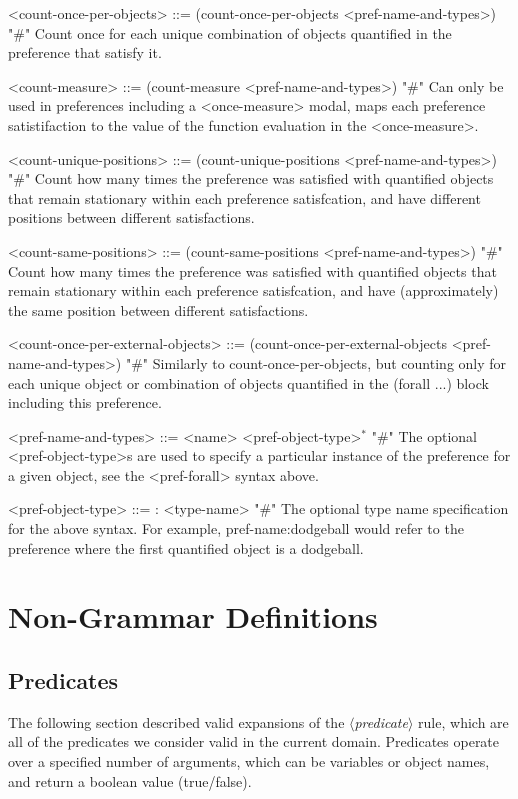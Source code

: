 \documentclass{article}
\newcommand{\dsl}[1]{{\it $\langle$#1$\rangle$}}
\begin{document}
\begin{grammar}
<count-once-per-objects> ::= (count-once-per-objects <pref-name-and-types>) "#" Count once for each unique combination of objects quantified in the preference that satisfy it.

<count-measure> ::= (count-measure <pref-name-and-types>) "#" Can only be used in preferences including a <once-measure> modal, maps each preference satistifaction to the value of the function evaluation in the <once-measure>.

<count-unique-positions> ::= (count-unique-positions <pref-name-and-types>) "#" Count how many times the preference was satisfied with quantified objects that remain stationary within each preference satisfcation, and have different positions between different satisfactions.

<count-same-positions> ::= (count-same-positions <pref-name-and-types>) "#" Count how many times the preference was satisfied with quantified objects that remain stationary within each preference satisfcation, and have (approximately) the same position between different satisfactions.

<count-once-per-external-objects> ::=  (count-once-per-external-objects <pref-name-and-types>) "#" Similarly to count-once-per-objects, but counting only for each unique object or combination of objects quantified in the (forall ...) block including this preference.

<pref-name-and-types> ::= <name> <pref-object-type>$^*$ "#" The optional <pref-object-type>s are used to specify a particular instance of the preference for a given object, see the <pref-forall> syntax above.

    <pref-object-type> ::= : <type-name>  "#" The optional type name specification for the above syntax. For example, pref-name:dodgeball would refer to the preference where the first quantified object is a dodgeball.




\end{grammar}



\section{Non-Grammar Definitions}


\subsection{Predicates} \label{sec:predicates}
The following section described valid expansions of the \dsl{predicate} rule,
        which are all of the predicates we consider valid in the current domain.
        Predicates operate over a specified number of arguments, which can be variables or object names, and return a boolean value (true/false).
\end{document}
